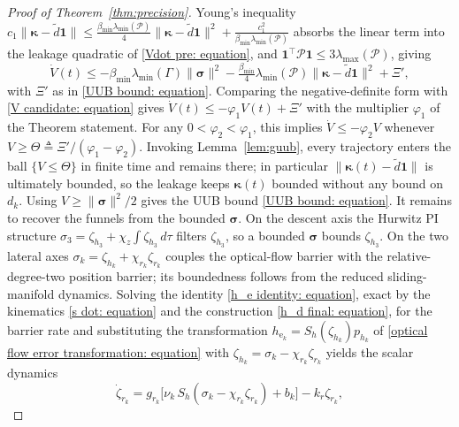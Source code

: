 \documentclass{IEEEtaes}
\theoremstyle{definition}
\theoremstyle{remark}
\begin{document}
\begin{proof}[Proof of Theorem~\ref{thm:precision}]
Young's inequality $c_1\|\boldsymbol{\kappa}-\tilde{d}\boldsymbol{1}\|\le\tfrac{\beta_{\min}\lambda_{\min}(\mathcal{P})}{4}\|\boldsymbol{\kappa}-\tilde{d}\boldsymbol{1}\|^2+\tfrac{c_1^2}{\beta_{\min}\lambda_{\min}(\mathcal{P})}$ absorbs the linear term into the leakage quadratic of \eqref{Vdot pre: equation}, and $\boldsymbol{1}^\top\mathcal{P}\boldsymbol{1}\le3\lambda_{\max}(\mathcal{P})$, giving
\begin{equation} \label{Vdot bound: equation}
    \dot{V}(t)\le
    -\beta_{\min}\lambda_{\min}(\Gamma)\|\boldsymbol{\sigma}\|^2
    -\tfrac{\beta_{\min}}{4}\lambda_{\min}(\mathcal{P})\|\boldsymbol{\kappa}-\tilde{d}\boldsymbol{1}\|^2
    +\Xi',
\end{equation}
with $\Xi'$ as in \eqref{UUB bound: equation}. Comparing the negative-definite form with \eqref{V candidate: equation} gives $\dot{V}(t)\le-\varphi_1 V(t)+\Xi'$ with the multiplier $\varphi_1$ of the Theorem statement.
For any $0<\varphi_2<\varphi_1$, this implies $\dot{V}\le-\varphi_2 V$ whenever $V\ge\Theta\triangleq \Xi'/(\varphi_1-\varphi_2)$. Invoking Lemma~\ref{lem:guub}, every trajectory enters the ball $\{V\le\Theta\}$ in finite time and remains there; in particular $\|\boldsymbol{\kappa}(t)-\tilde{d}\boldsymbol{1}\|$ is ultimately bounded, so the leakage keeps $\boldsymbol{\kappa}(t)$ bounded without any bound on $d_k$. Using $V\ge\|\boldsymbol{\sigma}\|^2/2$ gives the UUB bound \eqref{UUB bound: equation}. It remains to recover the funnels from the bounded $\boldsymbol{\sigma}$. On the descent axis the Hurwitz PI structure $\sigma_3=\zeta_{h_3}+\chi_z\!\int\zeta_{h_3}\,d\tau$ filters $\zeta_{h_3}$, so a bounded $\boldsymbol{\sigma}$ bounds $\zeta_{h_3}$. On the two lateral axes $\sigma_k=\zeta_{h_k}+\chi_{r_k}\zeta_{r_k}$ couples the optical-flow barrier with the relative-degree-two position barrier; its boundedness follows from the reduced sliding-manifold dynamics. Solving the identity \eqref{h_e identity: equation}, exact by the kinematics \eqref{s dot: equation} and the construction \eqref{h_d final: equation}, for the barrier rate and substituting the transformation $h_{\text{e}_k}=S_h(\zeta_{h_k})p_{h_k}$ of \eqref{optical flow error transformation: equation} with $\zeta_{h_k}=\sigma_k-\chi_{r_k}\zeta_{r_k}$ yields the scalar dynamics
\begin{equation} \label{reduced manifold: equation}
    \dot{\zeta}_{r_k}=g_{r_k}\big[\nu_k\,S_h(\sigma_k-\chi_{r_k}\zeta_{r_k})+b_k\big]-k_r\zeta_{r_k},
\end{equation}

\end{proof}
\end{document}
